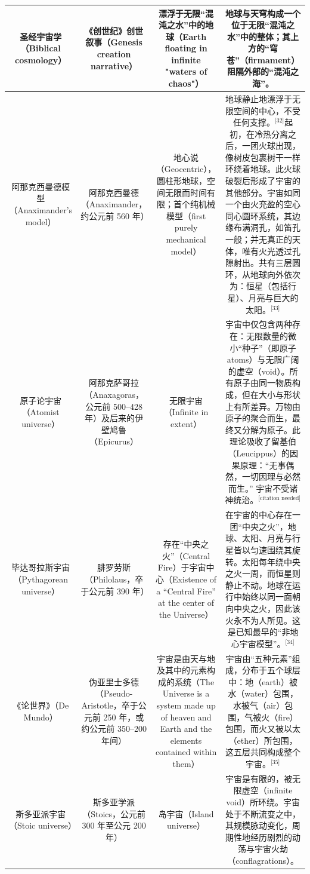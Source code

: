 \begin{table}[ht]
\begin{tabular}{|c|c|c|c|}
\hline
圣经宇宙学（Biblical cosmology）&《创世纪》创世叙事（Genesis creation narrative）& 漂浮于无限“混沌之水”中的地球（Earth floating in infinite "waters of chaos"）& 地球与天穹构成一个位于无限“混沌之水”中的整体；其上方的“穹苍”（firmament）阻隔外部的“混沌之海”。\\
\hline
阿那克西曼德模型（Anaximander's model）& 阿那克西曼德（Anaximander，约公元前 560 年）& 地心说（Geocentric），圆柱形地球，空间无限而时间有限；首个纯机械模型（first purely mechanical model）& 地球静止地漂浮于无限空间的中心，不受任何支撑。\(^\text{[32]}\)起初，在冷热分离之后，一团火球出现，像树皮包裹树干一样环绕着地球。此火球破裂后形成了宇宙的其他部分。宇宙如同一个由火充盈的空心同心圆环系统，其边缘布满洞孔，如笛孔一般；并无真正的天体，唯有火光透过孔隙射出。共有三层圆环，从地球向外依次为：恒星（包括行星）、月亮与巨大的太阳。\(^\text{[33]}\)\\
\hline
原子论宇宙（Atomist universe）& 阿那克萨哥拉（Anaxagoras，公元前 500–428 年）及后来的伊壁鸠鲁（Epicurus）& 无限宇宙（Infinite in extent）& 宇宙中仅包含两种存在：无限数量的微小“种子”（即原子 atoms）与无限广阔的虚空（void）。所有原子由同一物质构成，但在大小与形状上有所差异。万物由原子的聚合而生，最终又分解为原子。此理论吸收了留基伯（Leucippus）的因果原理：“无事偶然，一切因理与必然而生。” 宇宙不受诸神统治。\(^\text{[citation needed]}\)\\
\hline
毕达哥拉斯宇宙（Pythagorean universe）& 腓罗劳斯（Philolaus，卒于公元前 390 年）& 存在“中央之火”（Central Fire）于宇宙中心（Existence of a “Central Fire” at the center of the Universe）& 在宇宙的中心存在一团“中央之火”，地球、太阳、月亮与行星皆以匀速围绕其旋转。太阳每年绕中央之火一周，而恒星则静止不动。地球在运行中始终以同一面朝向中央之火，因此该火永不为人所见。这是已知最早的“非地心宇宙模型”。\(^\text{[34]}\)\\
\hline
《论世界》（De Mundo）& 伪亚里士多德（Pseudo-Aristotle，卒于公元前 250 年，或约公元前 350–200 年间）& 宇宙是由天与地及其中的元素构成的系统（The Universe is a system made up of heaven and Earth and the elements contained within them）& 宇宙由“五种元素”组成，分布于五个球层中：地（earth）被水（water）包围，水被气（air）包围，气被火（fire）包围，而火又被以太（ether）所包围，这五层共同构成整个宇宙。\(^\text{[35]}\)\\
\hline
斯多亚派宇宙（Stoic universe）& 斯多亚学派（Stoics，公元前 300 年至公元 200 年）& 岛宇宙（Island universe）& 宇宙是有限的，被无限虚空（infinite void）所环绕。宇宙处于不断流变之中，其规模脉动变化，周期性地经历剧烈的动荡与宇宙火劫（conflagrations）。\\

\end{tabular}
\end{table}
